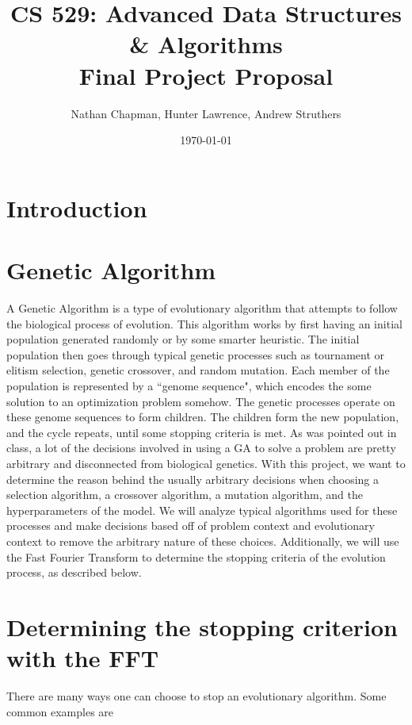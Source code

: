\documentclass{article}
\title{\vspace*{-0.625in}CS 529: Advanced Data Structures \& Algorithms \\ Final Project Proposal}
\author{Nathan Chapman, Hunter Lawrence, Andrew Struthers}
\date{\today}
\renewcommand{\_}{\ifincsname_\else\legacyunderscore\fi}
\begin{document}
    \maketitle

\section*{Introduction}

\section*{Genetic Algorithm}
A Genetic Algorithm is a type of evolutionary algorithm that attempts to follow the biological process of evolution. This algorithm works by first having an initial population generated randomly or by some smarter heuristic. The initial population then goes through typical genetic processes such as tournament or elitism selection, genetic crossover, and random mutation. Each member of the population is represented by a ``genome sequence", which encodes the some solution to an optimization problem somehow. The genetic processes operate on these genome sequences to form children. The children form the new population, and the cycle repeats, until some stopping criteria is met. As was pointed out in class, a lot of the decisions involved in using a GA to solve a problem are pretty arbitrary and disconnected from biological genetics. With this project, we want to determine the reason behind the usually arbitrary decisions when choosing a selection algorithm, a crossover algorithm, a mutation algorithm, and the hyperparameters of the model. We will analyze typical algorithms used for these processes and make decisions based off of problem context and evolutionary context to remove the arbitrary nature of these choices. Additionally, we will use the Fast Fourier Transform to determine the stopping criteria of the evolution process, as described below. 

\section*{Determining the stopping criterion with the FFT}

There are many ways one can choose to stop an evolutionary algorithm.  Some common examples are
\end{document}
